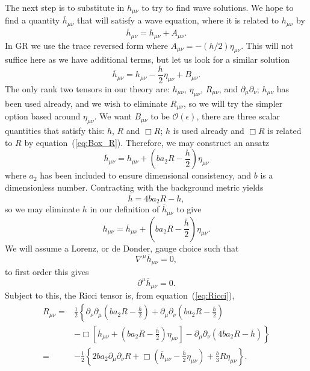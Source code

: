 \documentclass[a4paper, 11pt, titlepage, twoside]{report}
\newcommand{\eqnref}[1]{equation~(\ref{eq:#1})}
\newcommand{\order}[1]{\ensuremath{\mathcal{O}({#1})}}
\begin{document}
The next step is to substitute in $h_{\mu\nu}$ to try to find wave solutions. We hope to find a quantity $\overline{h}_{\mu\nu}$ that will satisfy a wave equation, where it is related to $h_{\mu\nu}$ by
\begin{equation}
\overline{h}_{\mu\nu} = h_{\mu\nu} + A_{\mu\nu}.
\end{equation}
In GR we use the trace reversed form where $A_{\mu\nu} = -(h/2)\eta_{\mu\nu}$. This will not suffice here as we have additional terms, but let us look for a similar solution
\begin{equation}
\overline{h}_{\mu\nu} = h_{\mu\nu} - \frac{h}{2}\eta_{\mu\nu} + B_{\mu\nu}.
\end{equation}
The only rank two tensors in our theory are: $h_{\mu\nu}$, $\eta_{\mu\nu}$, $R_{\mu\nu}$, and $\partial_\mu\partial_\nu$; $h_{\mu\nu}$ has been used already, and we wish to eliminate $R_{\mu\nu}$, so we will try the simpler option based around $\eta_{\mu\nu}$. We want $B_{\mu\nu}$ to be $\order{\epsilon}$, there are three scalar quantities that satisfy this: $h$, $R$ and $\Box R$; $h$ is used already and $\Box R$ is related to $R$ by \eqnref{Box_R}. Therefore, we may construct an ansatz
\begin{equation}
\overline{h}_{\mu\nu} = h_{\mu\nu} + \left(b a_2 R - \frac{h}{2}\right)\eta_{\mu\nu}
\label{eq:Ansatz}
\end{equation}
where $a_2$ has been included to ensure dimensional consistency, and $b$ is a dimensionless number. Contracting with the background metric yields
\begin{equation}
\overline{h} = 4b a_2 R - h,
\label{eq:h_trace}
\end{equation}
so we may eliminate $h$ in our definition of $\overline{h}_{\mu\nu}$ to give
\begin{equation}
h_{\mu\nu} = \overline{h}_{\mu\nu} + \left(b a_2 R -\frac{\overline{h}}{2}\right)\eta_{\mu\nu}.
\end{equation}
We will assume a Lorenz, or de Donder, gauge choice such that
\begin{equation}
\nabla^\mu \overline{h}_{\mu\nu} = 0,
\label{eq:Lorenz}
\end{equation}
to first order this gives
\begin{equation}
\partial^\mu \overline{h}_{\mu\nu} = 0.
\end{equation}
Subject to this, the Ricci tensor is, from \eqnref{Ricci},
\begin{align}
R_{\mu\nu} = {} & \frac{1}{2}\left\{\partial_\nu\partial_\mu \left(b a_2 R -\frac{\overline{h}}{2}\right) + \partial_\mu\partial_\nu \left(b a_2 R -\frac{\overline{h}}{2}\right) \right. \nonumber \\
 & \left. - \Box \left[\overline{h}_{\mu\nu} + \left(b a_2 R -\frac{\overline{h}}{2}\right)\eta_{\mu\nu}\right] - \partial_\mu\partial_\nu (4b a_2 R - \overline{h})\right\} \nonumber \\
 = {} & -\frac{1}{2}\left\{2b a_2 \partial_\mu\partial_\nu R + \Box\left(\overline{h}_{\mu\nu} -\frac{\overline{h}}{2}\eta_{\mu\nu}\right) + \frac{b}{3}R\eta_{\mu\nu}\right\}.
\end{align}
\end{document}
